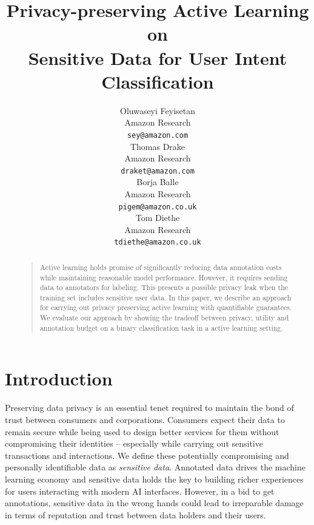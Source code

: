 \documentclass[letterpaper]{article}
\begin{document}
\title{Privacy-preserving Active Learning on \\ Sensitive Data for User Intent Classification}

\author{
  Oluwaseyi Feyisetan \\
  Amazon Research\\
  \texttt{sey@amazon.com} \\
 \And
 Thomas Drake \\
 Amazon Research\\
 \texttt{draket@amazon.com} \\
 \AND
 Borja Balle \\
 Amazon Research\\
 \texttt{pigem@amazon.co.uk} \\
 \And
 Tom Diethe \\
 Amazon Research\\
 \texttt{tdiethe@amazon.co.uk} \\
}

\maketitle
\begin{abstract}
\begin{quote}
Active learning holds promise of significantly reducing data annotation costs while maintaining reasonable model performance. However, it requires sending data to annotators for labeling. This presents a possible privacy leak when the training set includes sensitive user data. In this paper, we describe an approach for carrying out privacy preserving active learning with quantifiable guarantees. We evaluate our approach by showing the tradeoff between privacy, utility and annotation budget on a binary classification task in a active learning setting.
\end{quote}
\end{abstract}

\section{Introduction}
Preserving data privacy is an essential tenet required to maintain the bond of trust between consumers and corporations. Consumers expect their data to remain secure while being used to design better services for them without compromising their identities -- especially while carrying out sensitive transactions and interactions. We define these potentially compromising and personally identifiable data as \textit{sensitive data}. Annotated data drives the machine learning economy and sensitive data holds the key to building richer experiences for users interacting with modern AI interfaces. However, in a bid to get annotations, sensitive data in the wrong hands could lead to irreparable damage in terms of reputation and trust between data holders and their users.
\end{document}
